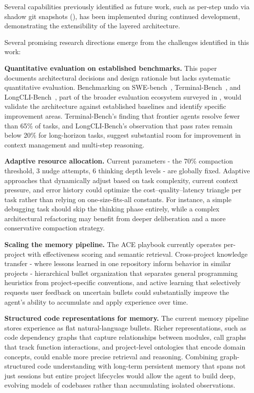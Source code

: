 Several capabilities previously identified as future work, such as per-step undo via shadow git snapshots (), has been implemented during continued development, demonstrating the extensibility of the layered architecture.

Several promising research directions emerge from the challenges identified in this work:

\begin{packeditemize}
\item \textbf{Quantitative evaluation on established benchmarks.} This paper documents architectural decisions and design rationale but lacks systematic quantitative evaluation. Benchmarking on SWE-bench~\cite{yang2024swe}, Terminal-Bench~\cite{terminal_bench}, and LongCLI-Bench~\cite{longcli_bench}, part of the broader evaluation ecosystem surveyed in , would validate the architecture against established baselines and identify specific improvement areas. Terminal-Bench's finding that frontier agents resolve fewer than 65\% of tasks, and LongCLI-Bench's observation that pass rates remain below 20\% for long-horizon tasks, suggest substantial room for improvement in context management and multi-step reasoning.

\item \textbf{Adaptive resource allocation.} Current parameters - the 70\% compaction threshold, 3 nudge attempts, 6 thinking depth levels - are globally fixed. Adaptive approaches that dynamically adjust based on task complexity, current context pressure, and error history could optimize the cost--quality--latency triangle per task rather than relying on one-size-fits-all constants. For instance, a simple debugging task should skip the thinking phase entirely, while a complex architectural refactoring may benefit from deeper deliberation and a more conservative compaction strategy.

\item \textbf{Scaling the memory pipeline.} The ACE playbook currently operates per-project with effectiveness scoring and semantic retrieval. Cross-project knowledge transfer - where lessons learned in one repository inform behavior in similar projects - hierarchical bullet organization that separates general programming heuristics from project-specific conventions, and active learning that selectively requests user feedback on uncertain bullets could substantially improve the agent's ability to accumulate and apply experience over time.

\item \textbf{Structured code representations for memory.} The current memory pipeline stores experience as flat natural-language bullets. Richer representations, such as code dependency graphs that capture relationships between modules, call graphs that track function interactions, and project-level ontologies that encode domain concepts, could enable more precise retrieval and reasoning. Combining graph-structured code understanding with long-term persistent memory that spans not just sessions but entire project lifecycles would allow the agent to build deep, evolving models of codebases rather than accumulating isolated observations.


\end{packeditemize}
